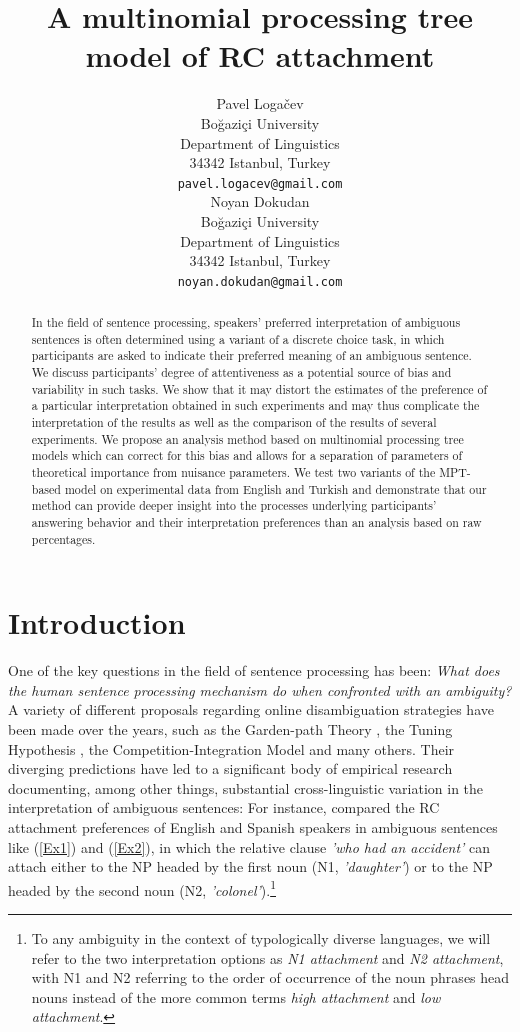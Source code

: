 \documentclass[11pt]{article}\usepackage[]{graphicx}\usepackage[]{color}
\title{A multinomial processing tree model of RC attachment}
\author{Pavel Logačev \\
  Boğaziçi University \\
  Department of Linguistics \\
  34342 Istanbul, Turkey \\
  \texttt{pavel.logacev@gmail.com} \\\And
  Noyan Dokudan \\
  Boğaziçi University \\
  Department of Linguistics \\
  34342 Istanbul, Turkey \\
  \texttt{noyan.dokudan@gmail.com} \\}
\begin{document}
\maketitle
\begin{abstract}
In the field of sentence processing, speakers' preferred interpretation of ambiguous sentences is often determined using a variant of a discrete choice task, in which participants are asked to indicate their preferred meaning of an ambiguous sentence. We discuss participants' degree of attentiveness as a potential source of bias and variability in such tasks. We show that it may distort the estimates of the preference of a particular interpretation obtained in such experiments and may thus complicate the interpretation of the results as well as the comparison of the results of several experiments. 
We propose an analysis method based on multinomial processing tree models \citep{BatchelderRiefer:1999} which can correct for this bias and allows for a separation of parameters of theoretical importance from nuisance parameters. We test two variants of the MPT-based model on experimental data from English and Turkish and demonstrate that our method can provide deeper insight into the processes underlying participants' answering behavior and their interpretation preferences than an analysis based on raw percentages. 
\end{abstract}

\section{Introduction}

One of the key questions in the field of sentence processing has been: \textit{What does the human sentence processing mechanism do when confronted with an ambiguity?} A variety of different proposals regarding online disambiguation strategies have been made over the years, such as the Garden-path Theory \citep{Frazier:1987}, the Tuning Hypothesis \citep{CuetosEtAl:1996}, the Competition-Integration Model \cite{McRaeEtAl:1998} and many others. 
Their diverging predictions have led to a significant body of empirical research documenting, among other things, substantial cross-linguistic variation in the interpretation of ambiguous sentences: 
For instance, \citet{CuetosMitchell:1988} compared the RC attachment preferences of English and Spanish speakers in ambiguous sentences like (\ref{Ex1}) and (\ref{Ex2}), in which the relative clause \textit{'who had an accident'} can attach either to the NP headed by the first noun (N1, \textit{'daughter'}) or to the NP headed by the second noun (N2, \textit{'colonel'}).\footnote{To any ambiguity in the context of typologically diverse languages, we will refer to the two interpretation options as \textit{N1 attachment} and \textit{N2 attachment}, with N1 and N2 referring to the order of occurrence of the noun phrases head nouns instead of the more common terms \textit{high attachment} and \textit{low attachment}.} 
\end{document}
